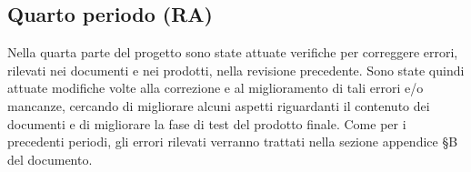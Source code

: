 \documentclass[../piano-di-qualifica.tex]{subfiles}
\begin{document}
\subsection{Quarto periodo (RA)}
\label{sub:quarto_periodo}
Nella quarta parte del progetto sono state attuate verifiche per correggere errori, rilevati nei documenti e nei prodotti, nella revisione precedente.
Sono state quindi attuate modifiche volte alla correzione e al miglioramento di tali errori e/o mancanze, cercando di migliorare alcuni aspetti riguardanti il contenuto dei documenti e di migliorare la fase di test del prodotto finale.
Come per i precedenti periodi, gli errori rilevati verranno trattati nella sezione appendice §B del documento.

\end{document}

